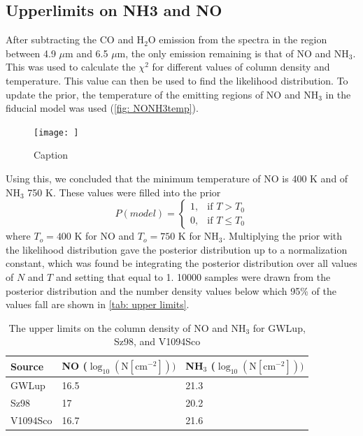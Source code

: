 \documentclass[twoside, single, authoryear, semicolon, 12pt]{lion-msc}
\newcommand{\4}{$_4$}
\newcommand{\3}{$_3$}
\newcommand{\2}{$_2$}
\begin{document}
\subsection{Upperlimits on NH3 and NO}
After subtracting the CO and H\2O emission from the spectra in the region between 4.9 $\mu$m and 6.5 $\mu$m, the only emission remaining is that of NO and NH\3. This was used to calculate the $\chi^2$ for different values of column density and temperature. This value can then be used to find the likelihood distribution. To update the prior, the temperature of the emitting regions of NO and NH\3 in the fiducial model was used (\autoref{fig: NONH3temp}).
\begin{figure}[H]
    \centering
    \texttt{[image: ]}
    \caption{Caption}
    \label{fig: NONH3temp}
\end{figure}
Using this, we concluded that the minimum temperature of NO is 400 K and of NH\3 750 K. These values were filled into the prior
\begin{equation}
    P(model) = 
    \begin{cases}
        1, & \text{if } T > T_0 \\
        0, & \text{if } T \leq T_0
    \end{cases}
\end{equation}
where $T_o=400$ K for NO and $T_o=750$ K for NH\3. Multiplying the prior with the likelihood distribution gave the posterior distribution up to a normalization constant, which was found be integrating the posterior distribution over all values of $N$ and $T$ and setting that equal to 1. 10000 samples were drawn from the posterior distribution and the number density values below which 95\% of the values fall are shown in \autoref{tab: upper limits}.

\begin{table}[H]
\begin{tabular}{lll}
\hline
Source   & NO ($\log_{10}(\mathrm{N[cm^{-2}]}))$   & NH\3 ($\log_{10}(\mathrm{N[cm^{-2}]}))$\\ \hline
GWLup    & 16.5 & 21.3               \\
Sz98     & 17   & 20.2               \\
V1094Sco & 16.7 & 21.6               \\ \hline
\end{tabular}
\caption{The upper limits on the column density of NO and NH\3 for GWLup, Sz98, and V1094Sco}
\label{tab: upper limits}
\end{table}
\end{document}

